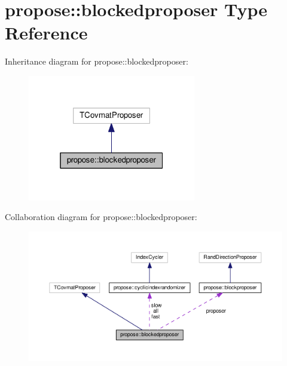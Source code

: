 \hypertarget{structpropose_1_1blockedproposer}{}\section{propose\+:\+:blockedproposer Type Reference}
\label{structpropose_1_1blockedproposer}


Inheritance diagram for propose\+:\+:blockedproposer\+:
\nopagebreak
\begin{figure}[H]
\begin{center}
\leavevmode
\includegraphics[width=208pt]{structpropose_1_1blockedproposer__inherit__graph}
\end{center}
\end{figure}


Collaboration diagram for propose\+:\+:blockedproposer\+:
\nopagebreak
\begin{figure}[H]
\begin{center}
\leavevmode
\includegraphics[width=350pt]{structpropose_1_1blockedproposer__coll__graph}
\end{center}
\end{figure}

